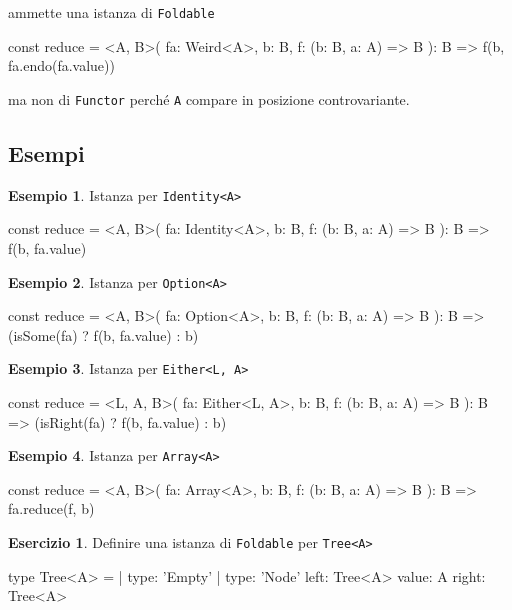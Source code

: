 \documentclass[12pt]{article}
\theoremstyle{definition}
\newtheorem{example}{Esempio}[section]
\newtheorem{exercise}{Esercizio}[section]
\newenvironment{code}
  {\vspace{0.5cm} \VerbatimEnvironment\begin{typescriptcode}}
  {\end{typescriptcode} \vspace{0.2cm}}
\begin{document}
ammette una istanza di \texttt{Foldable}

\begin{code}
const reduce = <A, B>(
  fa: Weird<A>,
  b: B,
  f: (b: B, a: A) => B
): B => f(b, fa.endo(fa.value))
\end{code}

ma non di \texttt{Functor} perché \texttt{A} compare in posizione controvariante.

\subsection{Esempi}

\begin{example}
Istanza per \texttt{Identity<A>}

\begin{code}
const reduce = <A, B>(
  fa: Identity<A>,
  b: B,
  f: (b: B, a: A) => B
): B => f(b, fa.value)
\end{code}
\end{example}

\begin{example}
Istanza per \texttt{Option<A>}

\begin{code}
const reduce = <A, B>(
  fa: Option<A>,
  b: B,
  f: (b: B, a: A) => B
): B => (isSome(fa) ? f(b, fa.value) : b)
\end{code}
\end{example}

\begin{example}
Istanza per \texttt{Either<L, A>}

\begin{code}
const reduce = <L, A, B>(
  fa: Either<L, A>,
  b: B,
  f: (b: B, a: A) => B
): B => (isRight(fa) ? f(b, fa.value) : b)
\end{code}
\end{example}

\begin{example}
Istanza per \texttt{Array<A>}

\begin{code}
const reduce = <A, B>(
  fa: Array<A>,
  b: B,
  f: (b: B, a: A) => B
): B => fa.reduce(f, b)
\end{code}
\end{example}

\begin{exercise}
Definire una istanza di \texttt{Foldable} per \texttt{Tree<A>}

\begin{code}
type Tree<A> =
  | { type: 'Empty' }
  | {
      type: 'Node'
      left: Tree<A>
      value: A
      right: Tree<A>
    }
\end{code}
\end{exercise}
\end{document}
